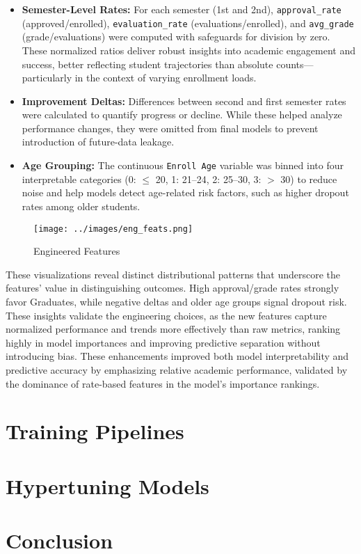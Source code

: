 \documentclass[twoside,final]{hcmut-report}
\begin{document}
\begin{itemize}
  \item \textbf{Semester-Level Rates:} For each semester (1st and 2nd), \texttt{approval\_rate} (approved/enrolled), \texttt{evaluation\_rate} (evaluations/enrolled), and \texttt{avg\_grade} (grade/evaluations) were computed with safeguards for division by zero. These normalized ratios deliver robust insights into academic engagement and success, better reflecting student trajectories than absolute counts—particularly in the context of varying enrollment loads.
  \item \textbf{Improvement Deltas:} Differences between second and first semester rates were calculated to quantify progress or decline. While these helped analyze performance changes, they were omitted from final models to prevent introduction of future-data leakage.
  \item \textbf{Age Grouping:} The continuous \texttt{Enroll Age} variable was binned into four interpretable categories (0: $\leq$ 20, 1: 21--24, 2: 25--30, 3: $>$ 30) to reduce noise and help models detect age-related risk factors, such as higher dropout rates among older students.
\end{itemize}

\begin{figure}[H]
  \centering
  \texttt{[image: ../images/eng\_feats.png]}
  \caption{Engineered Features}
  \label{eng_feats}
\end{figure}

These visualizations reveal distinct distributional patterns that underscore the features' value in distinguishing outcomes. High approval/grade rates strongly favor Graduates, while negative deltas and older age groups signal dropout risk. These insights validate the engineering choices, as the new features capture normalized performance and trends more effectively than raw metrics, ranking highly in model importances and improving predictive separation without introducing bias. These enhancements improved both model interpretability and predictive accuracy by emphasizing relative academic performance, validated by the dominance of rate-based features in the model's importance rankings.

\section{Training Pipelines}

\section{Hypertuning Models}
\newpage\section{Conclusion}
\end{document}
